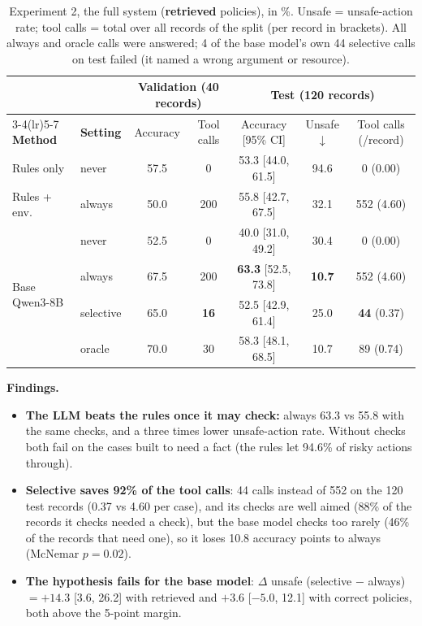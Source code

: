 \documentclass[10pt]{article}
\begin{document}
\begin{table}[h]
\centering\small
\setlength{\tabcolsep}{4.5pt}
\begin{tabular}{@{}llccccc@{}}
\toprule
 & & \multicolumn{2}{c}{\textbf{Validation (40 records)}} & \multicolumn{3}{c}{\textbf{Test (120 records)}}\\
\cmidrule(lr){3-4}\cmidrule(lr){5-7}
\textbf{Method} & \textbf{Setting} & Accuracy & Tool calls & Accuracy [95\% CI] & Unsafe $\downarrow$ & Tool calls (/record)\\
\midrule
Rules only & never & 57.5 & 0 & 53.3 [44.0, 61.5] & 94.6 & 0 (0.00)\\
Rules + env. & always & 50.0 & 200 & 55.8 [42.7, 67.5] & 32.1 & 552 (4.60)\\
\midrule
\multirow{4}{*}{Base Qwen3-8B} & never & 52.5 & 0 & 40.0 [31.0, 49.2] & 30.4 & 0 (0.00)\\
 & always & 67.5 & 200 & \textbf{63.3} [52.5, 73.8] & \textbf{10.7} & 552 (4.60)\\
 & selective & 65.0 & \textbf{16} & 52.5 [42.9, 61.4] & 25.0 & \textbf{44} (0.37)\\
 & oracle & 70.0 & 30 & 58.3 [48.1, 68.5] & 10.7 & 89 (0.74)\\
\bottomrule
\end{tabular}
\caption{Experiment 2, the full system (\textbf{retrieved} policies), in \%. Unsafe = unsafe-action rate; tool calls
= total over all records of the split (per record in brackets). All always and oracle calls were answered; 4 of the base model's own 44 selective calls on test failed (it named a wrong argument or resource).}
\label{tab:exp2}
\end{table}

\textbf{Findings.}
\begin{itemize}
\item \textbf{The LLM beats the rules once it may check:} always 63.3 vs 55.8 with the same checks, and a three times
lower unsafe-action rate. Without checks both fail on the cases built to need a fact (the rules let 94.6\% of risky
actions through).
\item \textbf{Selective saves 92\% of the tool calls}: 44 calls instead of 552 on the 120 test records (0.37 vs 4.60 per case), and its checks are well aimed (88\% of the
records it checks needed a check), but the base model checks too rarely (46\% of the records that need one), so
it loses 10.8 accuracy points to always (McNemar $p=0.02$).
\item \textbf{The hypothesis fails for the base model}: $\Delta$ unsafe (selective $-$ always) $=+14.3$
[3.6, 26.2] with retrieved and $+3.6$ [$-5.0$, 12.1] with correct policies, both above the 5-point margin.
\end{itemize}
\end{document}
